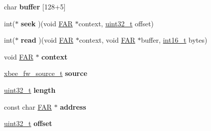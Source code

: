 \begin{DoxyCompactItemize}
\begin{tabbing}
\end{tabbing}\item 
\mbox{\label{group__xbee__firmware_gac45b1c32b0ad4fba20266476ed30eba8}} 
char {\bfseries buffer} \mbox{[}128+5\mbox{]}
\item 
\mbox{\label{group__xbee__firmware_ga30ee257aa91c265b0afee3124c2a218a}} 
int($\ast$ {\bfseries seek} )(void \hyperlink{group__hal_gaef060b3456fdcc093a7210a762d5f2ed}{F\+AR} $\ast$context, \hyperlink{group__hal__dos_ga09a1e304d66d35dd47daffee9731edaa}{uint32\+\_\+t} offset)
\item 
\mbox{\label{group__xbee__firmware_gaa8a1e862580632a934923c7643607fa0}} 
int($\ast$ {\bfseries read} )(void \hyperlink{group__hal_gaef060b3456fdcc093a7210a762d5f2ed}{F\+AR} $\ast$context, void \hyperlink{group__hal_gaef060b3456fdcc093a7210a762d5f2ed}{F\+AR} $\ast$buffer, \hyperlink{group__hal__dos_ga2140805d08462d474b82ddc8d1c2f3e6}{int16\+\_\+t} bytes)
\item 
\mbox{\label{group__xbee__firmware_gaa91f8e864e06077c354e5f5216547758}} 
void \hyperlink{group__hal_gaef060b3456fdcc093a7210a762d5f2ed}{F\+AR} $\ast$ {\bfseries context}
\item 
\mbox{\label{group__xbee__firmware_ga6de9d84924d5c74f1b9021b1637ecf50}} 
\hyperlink{structxbee__fw__source__t}{xbee\+\_\+fw\+\_\+source\+\_\+t} {\bfseries source}
\item 
\mbox{\label{group__xbee__firmware_gaebb70c2aab3407a9f05334c47131a43b}} 
\hyperlink{group__hal__dos_ga09a1e304d66d35dd47daffee9731edaa}{uint32\+\_\+t} {\bfseries length}
\item 
\mbox{\label{group__xbee__firmware_gad13231c128c8fc0014133ee29ccdf9f8}} 
const char \hyperlink{group__hal_gaef060b3456fdcc093a7210a762d5f2ed}{F\+AR} $\ast$ {\bfseries address}
\item 
\mbox{\label{group__xbee__firmware_ga894bdfa2d603d8343f8ef01dda6fcd23}} 
\hyperlink{group__hal__dos_ga09a1e304d66d35dd47daffee9731edaa}{uint32\+\_\+t} {\bfseries offset}
\end{DoxyCompactItemize}


